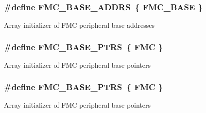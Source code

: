 \subsubsection[{\texorpdfstring{F\+M\+C\+\_\+\+B\+A\+S\+E\+\_\+\+A\+D\+D\+RS}{FMC_BASE_ADDRS}}]{\setlength{\rightskip}{0pt plus 5cm}\#define F\+M\+C\+\_\+\+B\+A\+S\+E\+\_\+\+A\+D\+D\+RS~\{ {\bf F\+M\+C\+\_\+\+B\+A\+SE} \}}\hypertarget{group__FMC__Peripheral__Access__Layer_ga37283f414971381846ab9da2c77096b3}{}\label{group__FMC__Peripheral__Access__Layer_ga37283f414971381846ab9da2c77096b3}
Array initializer of F\+MC peripheral base addresses 
\subsubsection[{\texorpdfstring{F\+M\+C\+\_\+\+B\+A\+S\+E\+\_\+\+P\+T\+RS}{FMC_BASE_PTRS}}]{\setlength{\rightskip}{0pt plus 5cm}\#define F\+M\+C\+\_\+\+B\+A\+S\+E\+\_\+\+P\+T\+RS~\{ {\bf F\+MC} \}}\hypertarget{group__FMC__Peripheral__Access__Layer_ga7ad26eb02eedda3bb7e2863700c32017}{}\label{group__FMC__Peripheral__Access__Layer_ga7ad26eb02eedda3bb7e2863700c32017}
Array initializer of F\+MC peripheral base pointers 
\subsubsection[{\texorpdfstring{F\+M\+C\+\_\+\+B\+A\+S\+E\+\_\+\+P\+T\+RS}{FMC_BASE_PTRS}}]{\setlength{\rightskip}{0pt plus 5cm}\#define F\+M\+C\+\_\+\+B\+A\+S\+E\+\_\+\+P\+T\+RS~\{ {\bf F\+MC} \}}\hypertarget{group__FMC__Peripheral__Access__Layer_ga7ad26eb02eedda3bb7e2863700c32017}{}\label{group__FMC__Peripheral__Access__Layer_ga7ad26eb02eedda3bb7e2863700c32017}
Array initializer of F\+MC peripheral base pointers 